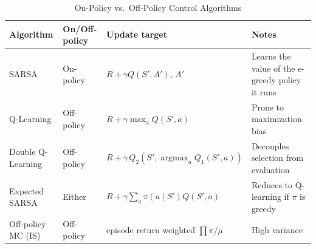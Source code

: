 \begin{table}[h]
    \centering
    \caption{On-Policy vs.\ Off-Policy Control Algorithms}
    \begin{tabularx}{\linewidth}{l l l X}
    \toprule
    \textbf{Algorithm} & \textbf{On/Off-policy} & \textbf{Update target} & \textbf{Notes} \\
    \midrule
    SARSA & On-policy & $R + \gamma Q(S',A')$, $A'$ & Learns the value of the $\epsilon$-greedy policy it runs \\
    \addlinespace
    Q-Learning & Off-policy & $R + \gamma \max_a Q(S',a)$ & Prone to maximization bias \\
    \addlinespace
    Double Q-Learning & Off-policy & $R + \gamma\, Q_2\!\left(S', \operatorname*{argmax}_a Q_1(S',a)\right)$ & Decouples selection from evaluation \\
    \addlinespace
    Expected SARSA & Either & $R + \gamma \sum_a \pi(a\mid S')Q(S',a)$ & Reduces to Q-learning if $\pi$ is greedy \\
    \addlinespace
    Off-policy MC (IS) & Off-policy & episode return weighted $\prod \pi/\mu$ & High variance \\
    \bottomrule
    \end{tabularx}
\end{table}